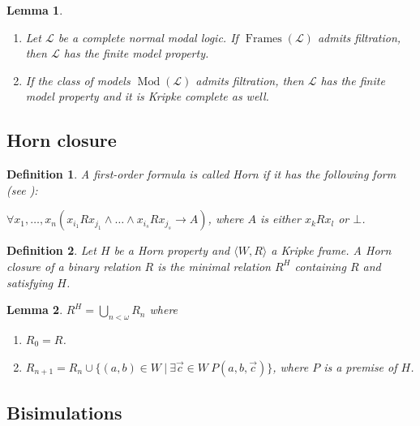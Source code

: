 \documentclass[a4paper]{article}
\theoremstyle{defin}
\newtheorem{defin}{Definition}
\theoremstyle{theorem}
\theoremstyle{prop}
\theoremstyle{lemma}
\newtheorem{lemma}{Lemma}
\theoremstyle{fact}
\theoremstyle{exercise}
\theoremstyle{ex}
\theoremstyle{col}
\theoremstyle{claim}
\begin{document}
\begin{lemma}
  $ $

\begin{enumerate}
  \item Let $\mathcal{L}$ be a complete normal modal logic. If $\operatorname{Frames}(\mathcal{L})$ admits filtration, then $\mathcal{L}$ has the finite model property.
  \item If the class of models $\operatorname{Mod}(\mathcal{L})$ admits filtration, then $\mathcal{L}$ has the finite model property and it is Kripke complete as well.
\end{enumerate}
\end{lemma}

\subsection{Horn closure}

\begin{defin} A first-order formula is called Horn if it has the following form (see \cite{chang1990model}):

  \begin{center}
    $\forall x_1, \dots, x_n (x_{i_1} R x_{j_1} \land \dots \land x_{i_s} R x_{j_s} \rightarrow A)$, where $A$ is either $x_k R x_l$ or $\bot$.
  \end{center}
\end{defin}

\begin{defin}
  Let $H$ be a Horn property and $\langle W, R \rangle$ a Kripke frame. A Horn closure of a binary relation $R$ is the minimal relation $R^{H}$ containing $R$ and satisfying $H$.
\end{defin}

\begin{lemma}
  $R^{H} = \bigcup \limits_{n < \omega} R_n$ where

  \begin{enumerate}
    \item $R_0 = R$.
    \item $R_{n + 1} = R_n \cup \{ (a, b) \in W \: | \: \exists \vec{c} \in W \: P(a, b, \vec{c})\}$, where $P$ is a premise of $H$.
  \end{enumerate}
\end{lemma}

\subsection{Bisimulations}
\end{document}
